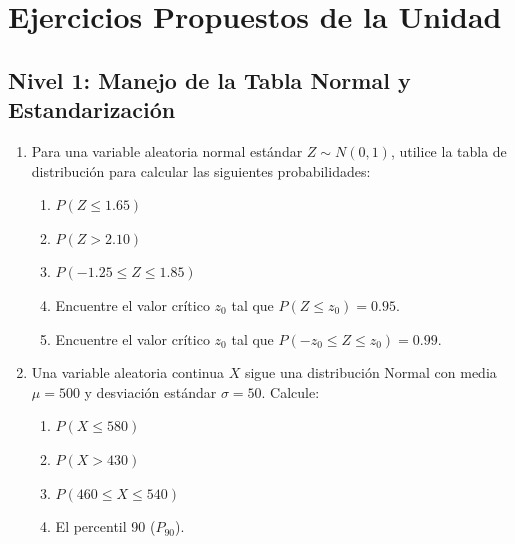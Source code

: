 \section{Ejercicios Propuestos de la Unidad}

\subsection*{Nivel 1: Manejo de la Tabla Normal y Estandarización}
\begin{enumerate}
    \item Para una variable aleatoria normal estándar $Z \sim N(0, 1)$, utilice la tabla de distribución para calcular las siguientes probabilidades:
    \begin{enumerate}[label=\alph*)]
        \item $P(Z \le 1.65)$
        \item $P(Z > 2.10)$
        \item $P(-1.25 \le Z \le 1.85)$
        \item Encuentre el valor crítico $z_0$ tal que $P(Z \le z_0) = 0.95$.
        \item Encuentre el valor crítico $z_0$ tal que $P(-z_0 \le Z \le z_0) = 0.99$.
    \end{enumerate}
    \item Una variable aleatoria continua $X$ sigue una distribución Normal con media $\mu = 500$ y desviación estándar $\sigma = 50$. Calcule:
    \begin{enumerate}[label=\alph*)]
        \item $P(X \le 580)$
        \item $P(X > 430)$
        \item $P(460 \le X \le 540)$
        \item El percentil 90 ($P_{90}$).
    \end{enumerate}
\end{enumerate}

